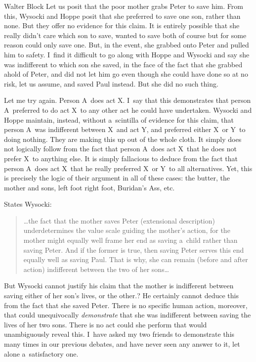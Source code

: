 \begin{artengenv}{Walter Block}
Let us posit that the poor mother grabs Peter to save him. From this, Wysocki and Hoppe posit that she preferred to save one son, rather than none. But they offer no evidence for this claim. It is entirely possible that she really didn't care which son to save, wanted to save both of course but for some reason could only save one. But, in the event, she grabbed onto Peter and pulled him to safety. I~find it difficult to go along with Hoppe and Wysocki and say she was indifferent to which son she saved, in the face of the fact that she grabbed ahold of Peter, and did not let him go even though she could have done so at no risk, let us assume, and saved Paul instead. But she did no such thing.



Let me try again. Person A~does act X. I~say that this demonstrates that person A~preferred to do act X~to any other act he could have undertaken. Wysocki and Hoppe maintain, instead, without a~scintilla of evidence for this claim, that person A~was indifferent between X~and act Y, and preferred either X~or Y~to doing nothing. They are making this up out of the whole cloth. It simply does not logically follow from the fact that person A~does act X~that he does not prefer X~to anything else. It is simply fallacious to deduce from the fact that person A~does act X~that he really preferred X~or Y~to all alternatives. Yet, this is precisely the logic of their argument in all of these cases: the butter, the mother and sons, left foot right foot, Buridan's Ass, etc.



States Wysocki:



\begin{quote}
…the fact that the mother saves Peter (extensional description) underdetermines the value scale guiding the mother's action, for the mother might equally well frame her end as saving a~child rather than saving Peter. And if the former is true, then saving Peter serves this end equally well as saving Paul. That is why, she can remain (before and after action) indifferent between the two of her sons…
\end{quote}



But Wysocki cannot justify his claim that the mother is indifferent between saving either of her son's lives, or the other.? He certainly cannot deduce this from the fact that she saved Peter. There is no specific human action, moreover, that could unequivocally \textit{demonstrate} that she was indifferent between saving the lives of her two sons. There is no act could she perform that would unambiguously reveal this. I~have asked my two friends to demonstrate this many times in our previous debates, and have never seen any answer to it, let alone a~satisfactory one.




\end{artengenv}
